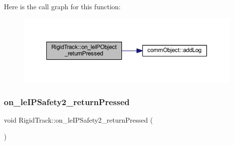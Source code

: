 Here is the call graph for this function\+:
\nopagebreak
\begin{figure}[H]
\begin{center}
\leavevmode
\includegraphics[width=350pt]{class_rigid_track_a9f037a061b2577815fc80e5e9f8d46d9_cgraph}
\end{center}
\end{figure}
\mbox{\label{class_rigid_track_a555c536593d659b940de43cd2db8d6c1}} 
\subsubsection{\texorpdfstring{on\+\_\+le\+I\+P\+Safety2\+\_\+return\+Pressed}{on\_leIPSafety2\_returnPressed}}
{\footnotesize\ttfamily void Rigid\+Track\+::on\+\_\+le\+I\+P\+Safety2\+\_\+return\+Pressed (\begin{DoxyParamCaption}{ }\end{DoxyParamCaption})\hspace{0.3cm}{\ttfamily [slot]}}

